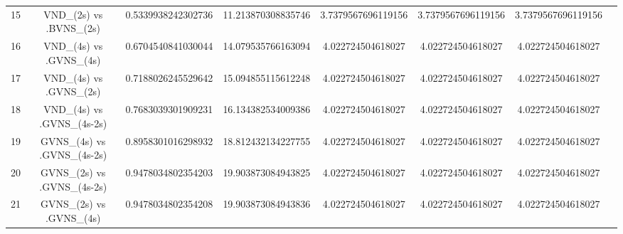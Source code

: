 \documentclass[a4paper,10pt]{article}
\begin{document}
\begin{landscape}
\begin{table}[!htp]
\begin{tabular}{cccccccc}
15&VND_(2s) vs .BVNS_(2s)&0.5339938242302736&11.213870308835746&3.7379567696119156&3.7379567696119156&3.7379567696119156\\
16&VND_(4s) vs .GVNS_(4s)&0.6704540841030044&14.079535766163094&4.022724504618027&4.022724504618027&4.022724504618027\\
17&VND_(4s) vs .GVNS_(2s)&0.7188026245529642&15.094855115612248&4.022724504618027&4.022724504618027&4.022724504618027\\
18&VND_(4s) vs .GVNS_(4s-2s)&0.7683039301909231&16.134382534009386&4.022724504618027&4.022724504618027&4.022724504618027\\
19&GVNS_(4s) vs .GVNS_(4s-2s)&0.8958301016298932&18.812432134227755&4.022724504618027&4.022724504618027&4.022724504618027\\
20&GVNS_(2s) vs .GVNS_(4s-2s)&0.9478034802354203&19.903873084943825&4.022724504618027&4.022724504618027&4.022724504618027\\
21&GVNS_(2s) vs .GVNS_(4s)&0.9478034802354208&19.903873084943836&4.022724504618027&4.022724504618027&4.022724504618027\\
\hline
\end{tabular}
\end{table}

\end{landscape}
\end{document}
